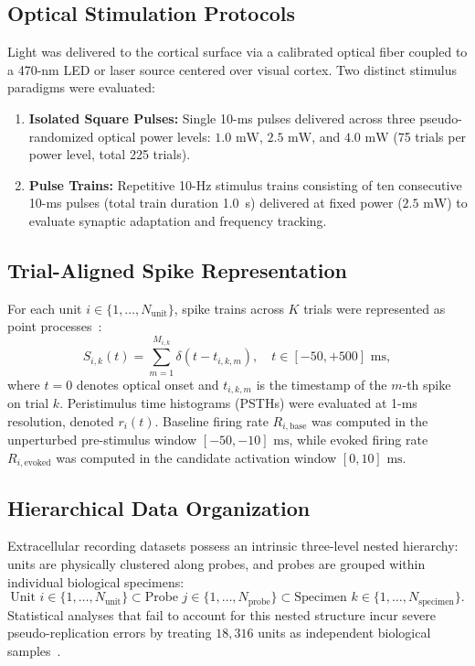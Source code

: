 \documentclass[10pt,journal,compsoc]{IEEEtran}
\begin{document}
\subsection{Optical Stimulation Protocols}
Light was delivered to the cortical surface via a calibrated optical fiber coupled to a 470-nm LED or laser source centered over visual cortex. Two distinct stimulus paradigms were evaluated:
\begin{enumerate}
    \item \textbf{Isolated Square Pulses:} Single 10-ms pulses delivered across three pseudo-randomized optical power levels: $1.0\text{ mW}$, $2.5\text{ mW}$, and $4.0\text{ mW}$ (75 trials per power level, total 225 trials).
    \item \textbf{Pulse Trains:} Repetitive 10-Hz stimulus trains consisting of ten consecutive 10-ms pulses (total train duration 1.0~s) delivered at fixed power ($2.5\text{ mW}$) to evaluate synaptic adaptation and frequency tracking.
\end{enumerate}

\subsection{Trial-Aligned Spike Representation}
For each unit $i \in \{1, \dots, N_{\text{unit}}\}$, spike trains across $K$ trials were represented as point processes~\cite{truccolo2005point,brown2004multiple}:
\begin{equation}
    S_{i,k}(t) = \sum_{m=1}^{M_{i,k}} \delta(t - t_{i,k,m}), \quad t \in [-50, +500]\text{ ms},
\end{equation}
where $t=0$ denotes optical onset and $t_{i,k,m}$ is the timestamp of the $m$-th spike on trial $k$. Peristimulus time histograms (PSTHs) were evaluated at 1-ms resolution, denoted $r_i(t)$. Baseline firing rate $R_{i,\text{base}}$ was computed in the unperturbed pre-stimulus window $[-50, -10]\text{ ms}$, while evoked firing rate $R_{i,\text{evoked}}$ was computed in the candidate activation window $[0, 10]\text{ ms}$.

\subsection{Hierarchical Data Organization}
Extracellular recording datasets possess an intrinsic three-level nested hierarchy: units are physically clustered along probes, and probes are grouped within individual biological specimens:
\begin{equation}
    \text{Unit } i \in \{1, \dots, N_{\text{unit}}\} \subset \text{Probe } j \in \{1, \dots, N_{\text{probe}}\} \subset \text{Specimen } k \in \{1, \dots, N_{\text{specimen}}\}.
\end{equation}
Statistical analyses that fail to account for this nested structure incur severe pseudo-replication errors by treating $18,316$ units as independent biological samples~\cite{aarts2014solution}.
\end{document}
